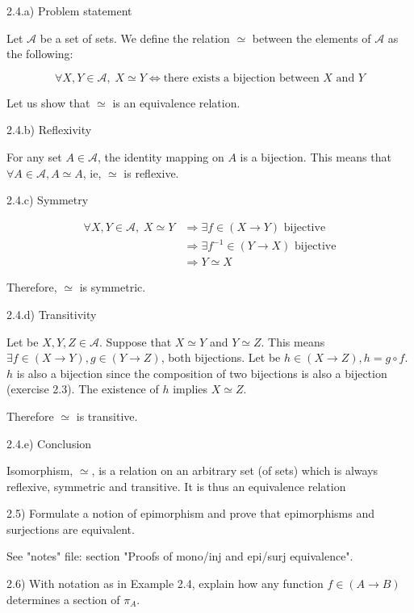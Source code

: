 2.4.a) Problem statement

Let $\mathcal{A}$ be a set of sets. We define the relation $\simeq$ between the elements of $\mathcal{A}$ as the following:

$$\forall X, Y \in \mathcal{A}, \; X \simeq Y \Leftrightarrow \text {there exists a bijection between $X$ and $Y$}$$

Let us show that $\simeq$ is an equivalence relation.


2.4.b) Reflexivity

For any set $A \in \mathcal{A}$, the identity mapping on $A$ is a bijection. This means that $\forall A \in \mathcal{A}, A \simeq A$, ie, $\simeq$ is reflexive.


2.4.c) Symmetry

$$
\begin{align*}
\forall X, Y \in \mathcal{A}, \; X \simeq Y & \Rightarrow \exists f      \in (X \to Y) \text{ bijective} \\
                                            & \Rightarrow \exists f^{-1} \in (Y \to X) \text{ bijective} \\
                                            & \Rightarrow Y \simeq X
\end{align*}
$$

Therefore, $\simeq$ is symmetric.


2.4.d) Transitivity

Let be $X, Y, Z \in \mathcal{A}$.
Suppose that $X \simeq Y$ and $Y \simeq Z$.
This means $\exists f \in (X \to Y), g \in (Y \to Z)$, both bijections.
Let be $h \in (X \to Z), h = g \circ f$. $h$ is also a bijection since the composition of two bijections is also a bijection (exercise 2.3).
The existence of $h$ implies $X \simeq Z$.

Therefore $\simeq$ is transitive.


2.4.e) Conclusion

Isomorphism, $\simeq$, is a relation on an arbitrary set (of sets) which is always reflexive, symmetric and transitive. It is thus an equivalence relation



2.5) Formulate a notion of epimorphism and prove that epimorphisms and surjections are equivalent.

See "notes" file: section "Proofs of mono/inj and epi/surj equivalence".


2.6) With notation as in Example 2.4, explain how any function $f \in (A \to B)$ determines a section of $\pi_A$.

